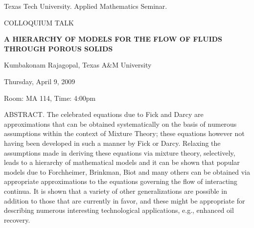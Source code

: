 \documentclass[oneside]{amsart}
\begin{document}
\begin{center}
Texas Tech University.  Applied Mathematics Seminar.

COLLOQUIUM TALK
\end{center}

\begin{center}

{\LARGE \uppercase{\textbf{
A hierarchy of models for the flow of fluids through porous solids
}}}

Kumbakonam Rajagopal, Texas A\&M University

Thursday, April 9, 2009

Room: MA 114, Time: 4:00pm

\end{center}

ABSTRACT.
The celebrated equations due to Fick and Darcy are approximations that can be obtained systematically on the basis of numerous assumptions within the context of Mixture Theory; these equations however not having been developed in such a manner by Fick or Darcy.  Relaxing the assumptions made in deriving these equations via mixture theory, selectively, leads to a hierarchy of mathematical models and it can be shown that popular models due to Forchheimer, Brinkman, Biot and many others can be obtained via appropriate approximations to the equations governing the flow of interacting continua.  It is shown that a variety of other generalizations are possible in addition to those that are currently in favor, and these might be appropriate for describing numerous  interesting technological applications, e.g., enhanced oil recovery.
\end{document}
